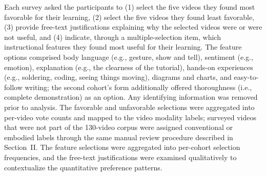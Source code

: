 Each survey asked the participants to (1) select the five videos they found most favorable for their learning, (2) select the five videos they found least favorable, (3) provide free-text justifications explaining why the selected videos were or were not useful, and (4) indicate, through a multiple-selection item, which instructional features they found most useful for their learning. The feature options comprised body language (e.g., gesture, show and tell), sentiment (e.g., emotion), explanation (e.g., the clearness of the tutorial), hands-on experiences (e.g., soldering, coding, seeing things moving), diagrams and charts, and easy-to-follow writing; the second cohort's form additionally offered thoroughness (i.e., complete demonstration) as an option. Any identifying information was removed prior to analysis. The favorable and unfavorable selections were aggregated into per-video vote counts and mapped to the video modality labels; surveyed videos that were not part of the 130-video corpus were assigned conventional or embodied labels through the same manual review procedure described in Section~II. The feature selections were aggregated into per-cohort selection frequencies, and the free-text justifications were examined qualitatively to contextualize the quantitative preference patterns.


    
    
    

